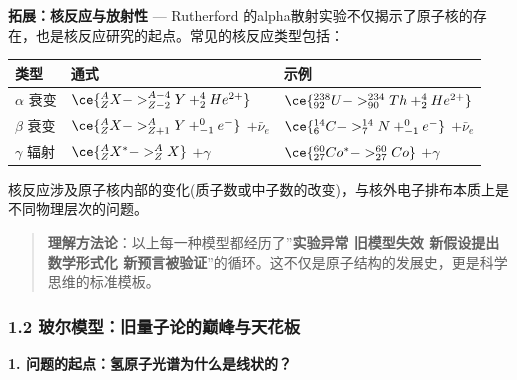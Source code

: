 \textbf{拓展：核反应与放射性} --- Rutherford 的alpha散射实验不仅揭示了原子核的存在，也是核反应研究的起点。常见的核反应类型包括：

{\def\LTcaptype{none} %
\begin{longtable}[]{@{}
  >{\raggedright\arraybackslash}p{}
  >{\raggedright\arraybackslash}p{}
  >{\raggedright\arraybackslash}p{}@{}}
\toprule\noalign{}
\begin{minipage}[b]{\linewidth}\raggedright
类型
\end{minipage} & \begin{minipage}[b]{\linewidth}\raggedright
通式
\end{minipage} & \begin{minipage}[b]{\linewidth}\raggedright
示例
\end{minipage} \\
\midrule\noalign{}
\endhead
\bottomrule\noalign{}
\endlastfoot
\(\alpha\) 衰变 & \(\ce{^{A}_{Z}X -> ^{A-4}_{Z-2}Y + ^{4}_{2}He^{2+}}\) & \(\ce{^{238}_{92}U -> ^{234}_{90}Th + ^{4}_{2}He^{2+}}\) \\
\(\beta\) 衰变 & \(\ce{^{A}_{Z}X -> ^{A}_{Z+1}Y + ^{0}_{-1}e^{-}}\) \(+ \bar{\nu}_e\) & \(\ce{^{14}_{6}C -> ^{14}_{7}N + ^{0}_{-1}e^{-}}\) \(+ \bar{\nu}_e\) \\
\(\gamma\) 辐射 & \(\ce{^{A}_{Z}X^{*} -> ^{A}_{Z}X}\) \(+ \gamma\) & \(\ce{^{60}_{27}Co^{*} -> ^{60}_{27}Co}\) \(+ \gamma\) \\
\end{longtable}
}

核反应涉及原子核内部的变化(质子数或中子数的改变)，与核外电子排布本质上是不同物理层次的问题。

\begin{quote}
\textbf{理解方法论}：以上每一种模型都经历了''\textbf{实验异常 \箭 旧模型失效 \箭 新假设提出 \箭 数学形式化 \箭 新预言被验证}''的循环。这不仅是原子结构的发展史，更是科学思维的标准模板。
\end{quote}

\subsubsection{1.2 玻尔模型：旧量子论的巅峰与天花板}\label{ux73bbux5c14ux6a21ux578bux65e7ux91cfux5b50ux8bbaux7684ux5dc5ux5cf0ux4e0eux5929ux82b1ux677f}

\textbf{1. 问题的起点：氢原子光谱为什么是线状的？}

